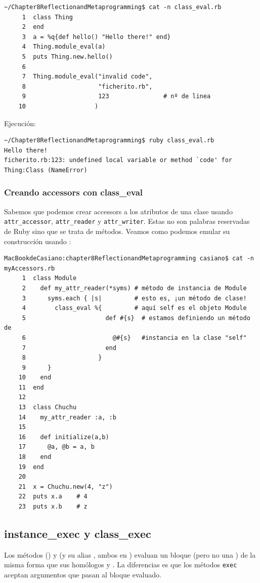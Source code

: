 \begin{verbatim}
~/Chapter8ReflectionandMetaprogramming$ cat -n class_eval.rb 
     1  class Thing
     2  end
     3  a = %q{def hello() "Hello there!" end}
     4  Thing.module_eval(a)
     5  puts Thing.new.hello()
     6                                     
     7  Thing.module_eval("invalid code", 
     8                    "ficherito.rb", 
     9                    123               # nº de linea
    10                   )
\end{verbatim}
Ejecución:
\begin{verbatim}
~/Chapter8ReflectionandMetaprogramming$ ruby class_eval.rb 
Hello there!
ficherito.rb:123: undefined local variable or method `code' for Thing:Class (NameError)
\end{verbatim}


\subsubsection{Creando accessors con class\_eval}
Sabemos que podemos crear accessors a los atributos de una clase
usando \verb|attr_accessor|, \verb|attr_reader| y \verb|attr_writer|.
Estas no son palabras reservadas de Ruby sino que se trata de métodos.
Veamos como podemos emular su construcción  usando :

\begin{verbatim}
MacBookdeCasiano:chapter8ReflectionandMetaprogramming casiano$ cat -n myAccessors.rb 
     1  class Module
     2    def my_attr_reader(*syms) # método de instancia de Module
     3      syms.each { |s|         # esto es, ¡un método de clase!
     4        class_eval %{         # aquí self es el objeto Module
     5                      def #{s}  # estamos definiendo un método de 
     6                        @#{s}   #instancia en la clase "self"
     7                      end
     8                    }
     9      }
    10    end
    11  end
    12  
    13  class Chuchu
    14    my_attr_reader :a, :b
    15  
    16    def initialize(a,b)
    17      @a, @b = a, b
    18    end
    19  end
    20  
    21  x = Chuchu.new(4, "z")
    22  puts x.a    # 4
    23  puts x.b    # z
\end{verbatim}

  \subsection{instance\_exec y class\_exec}
Los métodos
 (\BasicObject{})
y 
(y su alias , ambos en \Module{})
evaluan un bloque 
(pero no una \String{})
de la misma forma que sus homólogos 
y .
La diferencias es que los métodos \verb|exec| aceptan argumentos
que pasan al bloque evaluado.

